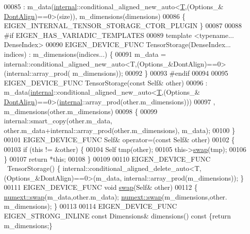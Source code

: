 \begin{DoxyCode}
00085         : m\_data(\hyperlink{namespaceinternal}{internal}::conditional\_aligned\_new\_auto<\hyperlink{group___sparse_core___module_class_eigen_1_1_triplet}{T},(Options\_&
      \hyperlink{group__enums_ggaacded1a18ae58b0f554751f6cdf9eb13a40a452614141522dd313363dbbd65726}{DontAlign})==0>(size)), m\_dimensions(dimensions)
00086       \{ EIGEN\_INTERNAL\_TENSOR\_STORAGE\_CTOR\_PLUGIN \}
00087 
00088 \textcolor{preprocessor}{#if EIGEN\_HAS\_VARIADIC\_TEMPLATES}
00089     \textcolor{keyword}{template} <\textcolor{keyword}{typename}... DenseIndex>
00090     EIGEN\_DEVICE\_FUNC TensorStorage(DenseIndex... indices) : m\_dimensions(indices...) \{
00091       m\_data = internal::conditional\_aligned\_new\_auto<T,(Options\_&DontAlign)==0>(internal::array\_prod(
      m\_dimensions));
00092     \}
00093 \textcolor{preprocessor}{#endif}
00094 
00095     EIGEN\_DEVICE\_FUNC TensorStorage(\textcolor{keyword}{const} Self& other)
00096       : m\_data(\hyperlink{namespaceinternal}{internal}::conditional\_aligned\_new\_auto<\hyperlink{group___sparse_core___module_class_eigen_1_1_triplet}{T},(Options\_&
      \hyperlink{group__enums_ggaacded1a18ae58b0f554751f6cdf9eb13a40a452614141522dd313363dbbd65726}{DontAlign})==0>(\hyperlink{namespaceinternal}{internal}::array\_prod(other.m\_dimensions)))
00097       , m\_dimensions(other.m\_dimensions)
00098     \{
00099       internal::smart\_copy(other.m\_data, other.m\_data+internal::array\_prod(other.m\_dimensions), m\_data);
00100     \}
00101     EIGEN\_DEVICE\_FUNC Self& operator=(\textcolor{keyword}{const} Self& other)
00102     \{
00103       \textcolor{keywordflow}{if} (\textcolor{keyword}{this} != &other) \{
00104         Self tmp(other);
00105         this->\hyperlink{endian_8c_a3ca5ecd34b04d6a243c054ac3a57f68d}{swap}(tmp);
00106       \}
00107       \textcolor{keywordflow}{return} *\textcolor{keyword}{this};
00108     \}
00109 
00110     EIGEN\_DEVICE\_FUNC  ~TensorStorage() \{ 
      internal::conditional\_aligned\_delete\_auto<T,(Options\_&DontAlign)==0>(m\_data, internal::array\_prod(m\_dimensions)); \}
00111     EIGEN\_DEVICE\_FUNC  \textcolor{keywordtype}{void} \hyperlink{endian_8c_a3ca5ecd34b04d6a243c054ac3a57f68d}{swap}(Self& other)
00112     \{ \hyperlink{endian_8c_a3ca5ecd34b04d6a243c054ac3a57f68d}{numext::swap}(m\_data,other.m\_data); \hyperlink{endian_8c_a3ca5ecd34b04d6a243c054ac3a57f68d}{numext::swap}(m\_dimensions,other.
      m\_dimensions); \}
00113 
00114     EIGEN\_DEVICE\_FUNC EIGEN\_STRONG\_INLINE \textcolor{keyword}{const} Dimensions& dimensions()\textcolor{keyword}{ const }\{\textcolor{keywordflow}{return} m\_dimensions;\}

\end{DoxyCode}
